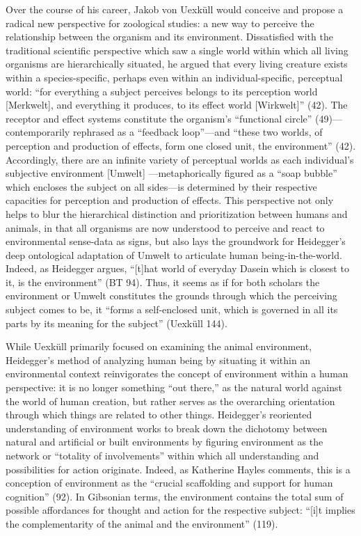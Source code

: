 \documentclass{article}
\begin{document}
Over the course of his career, Jakob von Uexküll would conceive and propose a radical new perspective for zoological studies: a new way to perceive the relationship between the organism and its environment. Dissatisfied with the traditional scientific perspective which saw a single world within which all living organisms are hierarchically situated, he argued that every living creature exists within a species-specific, perhaps even within an individual-specific, perceptual world: ``for everything a subject perceives belongs to its perception world [Merkwelt], and everything it produces, to its effect world [Wirkwelt]'' (42). The receptor and effect systems constitute the organism's ``functional circle'' (49)—contemporarily rephrased as a ``feedback loop''—and ``these two worlds, of perception and production of effects, form one closed unit, the environment'' (42). Accordingly, there are an infinite variety of perceptual worlds as each individual's subjective environment [Umwelt] —metaphorically figured as a ``soap bubble'' which encloses the subject on all sides—is determined by their respective capacities for perception and production of effects. This perspective not only helps to blur the hierarchical distinction and prioritization between humans and animals, in that all organisms are now understood to perceive and react to environmental sense-data as signs, but also lays the groundwork for Heidegger's deep ontological adaptation of Umwelt to articulate human being-in-the-world. Indeed, as Heidegger argues, ``[t]hat world of everyday Dasein which is closest to it, is the environment'' (BT 94). Thus, it seems as if for both scholars the environment or Umwelt constitutes the grounds through which the perceiving subject comes to be, it ``forms a self-enclosed unit, which is governed in all its parts by its meaning for the subject'' (Uexküll 144).

While Uexküll primarily focused on examining the animal environment, Heidegger's method of analyzing human being by situating it within an environmental context reinvigorates the concept of environment within a human perspective: it is no longer something ``out there,'' as the natural world against the world of human creation, but rather serves as the overarching orientation through which things are related to other things. Heidegger's reoriented understanding of environment works to break down the dichotomy between natural and artificial or built environments by figuring environment as the network or ``totality of involvements'' within which all understanding and possibilities for action originate. Indeed, as Katherine Hayles comments, this is a conception of environment as the ``crucial scaffolding and support for human cognition'' (92). In Gibsonian terms, the environment contains the total sum of possible affordances for thought and action for the respective subject: ``[i]t implies the complementarity of the animal and the environment'' (119).
\end{document}
